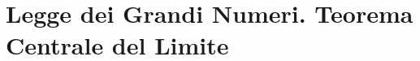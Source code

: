 
\chapter{Legge dei Grandi Numeri. Teorema Centrale del Limite}

\ParteEsercizi

\Esercizio{}

\ParteSoluzioni

\Soluzione{}